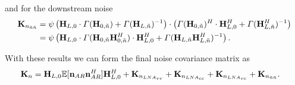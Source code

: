 and for the downstream noise
\begin{align}
\nonumber
\mathbf{K}_{n_{\tilde{n}\tilde{n}}}
&=\psi\left(\mathbf{H}_{L,0}\cdot\Gamma(\mathbf{H}_{0,\tilde{n}})+\Gamma(\mathbf{H}_{L,\tilde{n}})^{-1}\right)\cdot
\left(\Gamma(\mathbf{H}_{0,\tilde{n}})^H\cdot\mathbf{H}_{L,0}^H+\Gamma(\mathbf{H}_{L,\tilde{n}}^H)^{-1}\right)\\
&=\psi\left(\mathbf{H}_{L,0}\cdot\Gamma(\mathbf{H}_{0,\tilde{n}}\mathbf{H}_{0,\tilde{n}}^H)\cdot\mathbf{H}_{L,0}^H + \Gamma(\mathbf{H}_{L,\tilde{n}}\mathbf{H}_{L,\tilde{n}}^H)^{-1}\right).
\end{align}

With these results we can form the final noise covariance matrix as 
\begin{align}
\label{eq:noise_cov}
\mat{K}_n&= %
\mat{H}_{L,0}\mathbb{E}[\vec{n}_{AR}\vec{n}_{AR}^H]\mat{H}_{L,0}^H +
\mat{K}_{n_{LNA_{vv}}}+
\mat{K}_{n_{LNA_{cc}}}+
\mat{K}_{n_{LNA_{vc}}}+
\mat{K}_{n_{\tilde{n}\tilde{n}}}.
\end{align}











